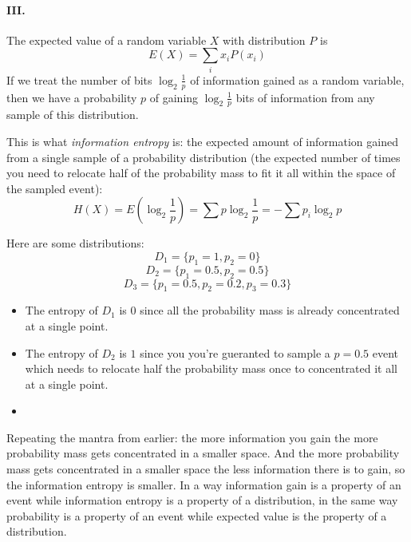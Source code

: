 \paragraph{III.}
The expected value of a random variable $X$ with distribution $P$ is
$$E(X)=\sum_{i}{}x_i P(x_i)$$
If we treat the number of bits $\log_2{\frac{1}{p}}$ of information gained as a random variable, then we have a probability $p$ of gaining $\log_2{\frac{1}{p}}$ bits of information from any sample of this distribution.
\par
This is what \textit{information entropy} is: the expected amount of information gained from a single sample of a probability distribution (the expected number of times you need to relocate half of the probability mass to fit it all within the space of the sampled event): 
$$H(X)=E(\log_2{\frac{1}{p}})=\sum p\log_2{\frac{1}{p}}=-\sum p_i\log_2{p}$$
\par
Here are some distributions:
$$D_1=\{p_1=1,p_2=0\}$$
$$D_2=\{p_1=0.5, p_2=0.5\}$$
$$D_3=\{p_1=0.5, p_2=0.2, p_3=0.3\}$$
\begin{itemize}
    \item
        The entropy of $D_1$ is $0$ since all the probability mass is already concentrated at a single point.
    \item
        The entropy of $D_2$ is $1$ since you you're gueranted to sample a $p=0.5$ event which needs to relocate half the probability mass once to concentrated it all at a single point.
    \item
\end{itemize}
Repeating the mantra from earlier: the more information you gain the more probability mass gets concentrated in a smaller space. And the more probability mass gets concentrated in a smaller space the less information there is to gain, so the information entropy is smaller. In a way information gain is a property of an event while information entropy is a property of a distribution, in the same way probability is a property of an event while expected value is the property of a distribution.

